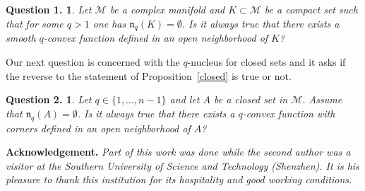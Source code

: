 \documentclass[11pt,a4paper]{article}
\newtheorem*{quest1}{Question 1.}
\newtheorem*{quest2}{Question 2.}
\newcommand{\Mcal}{\mathcal{M}}
\newcommand{\nuc}{\mathfrak{n}}
\begin{document}
\begin{quest1} Let $\Mcal$ be a complex manifold and $K \subset \Mcal$ be a compact set such that for some   $q > 1$ one has $\nuc_q(K) = \emptyset$. Is it always true that there exists a \emph{smooth} $q$-convex function defined in an open neighborhood of $K$? 
\end{quest1} 

Our next question is concerned with the $q$-nucleus for closed sets and it asks if the reverse to the statement of Proposition~\ref{closed} is true or not.


\begin{quest2} Let $q\in\{1,\ldots,n-1\}$ and let $A$ be a closed set in $\Mcal$. Assume that $\nuc_q(A) = \emptyset$. Is it always true that there exists a $q$-convex function with corners defined in an open neighborhood of $A$? 
\end{quest2} 


\vspace{3mm}
\noindent
{\bf Acknowledgement.} {\it Part of this work was done while the second author was a visitor at the Southern University of Science and Technology (Shenzhen). It is his pleasure to thank this institution for its hospitality and good working conditions.}
\end{document}
